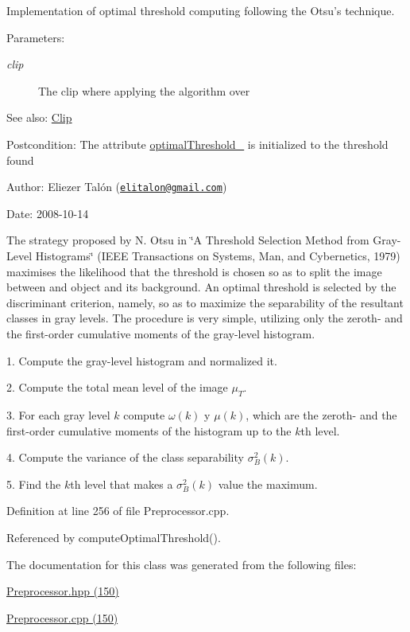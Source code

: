 Implementation of optimal threshold computing following the Otsu's technique. 

\begin{Desc}
\item[Parameters:]
\begin{description}
\item[{\em clip}]The clip where applying the algorithm over\end{description}
\end{Desc}
\begin{Desc}
\item[See also:]\hyperlink{class_clip}{Clip}\end{Desc}
\begin{Desc}
\item[Postcondition:]The attribute \hyperlink{class_preprocessor_865b1e28dd9535b96f70727a550104fe}{optimalThreshold\_\-} is initialized to the threshold found\end{Desc}
\begin{Desc}
\item[Author:]Eliezer Talón (\href{mailto:elitalon@gmail.com}{\tt elitalon@gmail.com}) \end{Desc}
\begin{Desc}
\item[Date:]2008-10-14\end{Desc}
The strategy proposed by N. Otsu in \char`\"{}A Threshold Selection Method from Gray-Level Histograms\char`\"{} (IEEE Transactions on Systems, Man, and Cybernetics, 1979) maximises the likelihood that the threshold is chosen so as to split the image between and object and its background. An optimal threshold is selected by the discriminant criterion, namely, so as to maximize the separability of the resultant classes in gray levels. The procedure is very simple, utilizing only the zeroth- and the first-order cumulative moments of the gray-level histogram. 

1. Compute the gray-level histogram and normalized it.

2. Compute the total mean level of the image $\mu_T$.

3. For each gray level $k$ compute $\omega(k)$ y $\mu(k)$, which are the zeroth- and the first-order cumulative moments of the histogram up to the $k$th level.

4. Compute the variance of the class separability $\sigma_B^2(k)$.

5. Find the $k$th level that makes a $\sigma_B^2(k)$ value the maximum. 

Definition at line 256 of file Preprocessor.cpp.

Referenced by computeOptimalThreshold().

The documentation for this class was generated from the following files:\begin{CompactItemize}
\item 
\hyperlink{_preprocessor_8hpp}{Preprocessor.hpp (150)}\item 
\hyperlink{_preprocessor_8cpp}{Preprocessor.cpp (150)}\end{CompactItemize}
